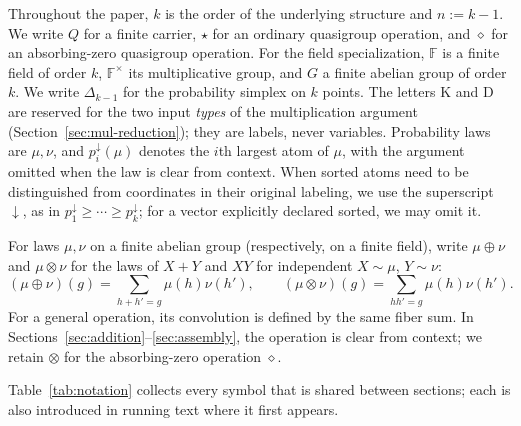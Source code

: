 \documentclass[11pt]{article}
\theoremstyle{definition}
\theoremstyle{remark}
\newcommand{\F}{\mathbb{F}}
\newcommand{\down}{\downarrow}
\begin{document}
Throughout the paper, $k$ is the order of the underlying structure and
$n:=k-1$.  We write $Q$ for a finite carrier, $\star$ for an ordinary
quasigroup operation, and $\diamond$ for an absorbing-zero quasigroup
operation.  For the field specialization, $\F$ is a finite field of order
$k$, $\F^\times$ its multiplicative group, and $G$ a finite abelian group
of order $k$.  We write
$\Delta_{k-1}$ for the probability simplex on $k$ points.  The letters
$\mathrm K$ and $\mathrm D$ are reserved for the two input \emph{types} of
the multiplication argument (Section~\ref{sec:mul-reduction}); they are
labels, never variables.  Probability laws are $\mu,\nu$, and
$p_i^\down(\mu)$ denotes the $i$th largest atom of $\mu$, with the
argument omitted when the law is clear from context.  When sorted atoms
need to be distinguished from coordinates in their original labeling, we
use the superscript $\down$, as in $p_1^\down\ge\cdots\ge p_k^\down$; for
a vector explicitly declared sorted, we may omit it.

For laws $\mu,\nu$ on a finite abelian group (respectively, on a finite
field), write $\mu\oplus\nu$ and $\mu\otimes\nu$ for the laws of $X+Y$
and $XY$ for independent $X\sim\mu$, $Y\sim\nu$:
\[
 (\mu\oplus\nu)(g)=\sum_{h+h'=g}\mu(h)\nu(h'),\qquad
 (\mu\otimes\nu)(g)=\sum_{hh'=g}\mu(h)\nu(h').
\]
For a general operation, its convolution is defined by the same fiber sum.
In Sections~\ref{sec:addition}--\ref{sec:assembly}, the operation is clear
from context; we retain $\otimes$ for the absorbing-zero operation
$\diamond$.

Table~\ref{tab:notation} collects every symbol that is shared between
sections; each is also introduced in running text where it first appears.
\end{document}
